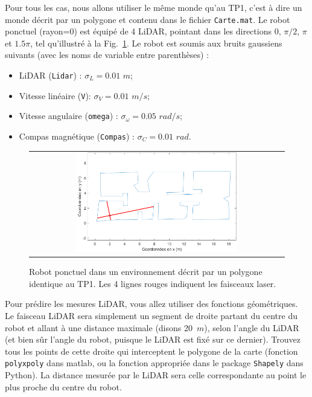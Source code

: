 \documentclass[12pt]{article}
\begin{document}
Pour tous les cas, nous allons utiliser le même monde qu'au TP1, c'est à dire un monde décrit par un polygone et contenu dans le fichier \texttt{Carte.mat}. Le robot ponctuel (rayon=0) est équipé de 4 LiDAR, pointant dans les directions 0, $\pi/2$,  $\pi$ et $1.5\pi$, tel qu'illustré à la Fig.~\ref{CartePlusRobotLiDAR}. Le robot est soumis aux bruits gaussiens suivants (avec les noms de variable entre parenthèses) :
\begin{itemize}
\item LiDAR (\texttt{Lidar}) : $\sigma_{L}=0.01$ $m$;
\item Vitesse linéaire (\texttt{V}): $\sigma_{V}=0.01$ $m/s$;
\item Vitesse angulaire (\texttt{omega}) : $\sigma_{\omega}=0.05$ $rad/s$;
\item Compas magnétique  (\texttt{Compas}) : $\sigma_{C}=0.01$ $rad$.
\end{itemize}

\begin{figure}[ht]
 \begin{center}
  \begin{tabular}{c}
    \includegraphics[width=0.65\textwidth]{CartePlusRobotLiDAR.png}
  \end{tabular}
 \end{center}
 \vspace{-0.3in}
 \caption{Robot ponctuel dans un environnement décrit par un polygone identique au TP1. Les 4 lignes rouges indiquent les faisceaux laser.}
 \label{CartePlusRobotLiDAR}
\end{figure}

Pour prédire les mesures LiDAR, vous allez utiliser des fonctions géométriques. Le faisceau LiDAR sera simplement un segment de droite partant du centre du robot et allant à une distance maximale (disons 20~$m$), selon l'angle du LiDAR (et bien sûr l'angle du robot, puisque le LiDAR est fixé sur ce dernier). Trouvez tous les points de cette droite qui interceptent le polygone de la carte (fonction \texttt{polyxpoly} dans matlab, ou la fonction appropriée dans le package  \texttt{Shapely} dans Python).  La distance mesurée par le LiDAR sera celle correspondante au point le plus proche du centre du robot.
\end{document}
